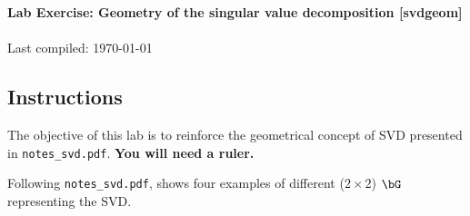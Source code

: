 \documentclass[11pt,titlepage,fleqn]{article}
\begin{document}

\begin{spacing}{1.2}
\centering
{\large \bf Lab Exercise: Geometry of the singular value decomposition [svdgeom]} \\
\cltag\ \\
Last compiled: \today
\end{spacing}


\subsection*{Instructions}

The objective of this lab is to reinforce the geometrical concept of SVD \citep{TrefethenBau} presented in \verb+notes_svd.pdf+. {\bf You will need a ruler.}

Following \verb+notes_svd.pdf+,  shows four examples of different ($2 \times 2$) $\bG$ representing the SVD.
\end{document}
